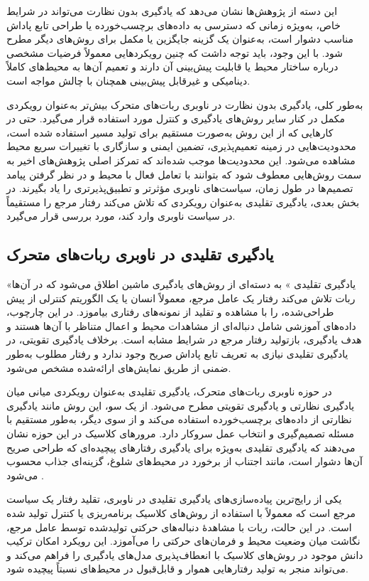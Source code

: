 این دسته از پژوهش‌ها نشان می‌دهد که یادگیری بدون نظارت می‌تواند در شرایط خاص، به‌ویژه زمانی که دسترسی به داده‌های برچسب‌خورده یا طراحی تابع پاداش مناسب دشوار است، به‌عنوان یک گزینه جایگزین یا مکمل برای روش‌های دیگر مطرح شود. با این وجود، باید توجه داشت که چنین رویکردهایی معمولاً فرضیات مشخصی درباره ساختار محیط یا قابلیت پیش‌بینی آن دارند و تعمیم آن‌ها به محیط‌های کاملاً دینامیکی و غیرقابل پیش‌بینی همچنان با چالش مواجه است.

به‌طور کلی، یادگیری بدون نظارت در ناوبری ربات‌های متحرک بیش‌تر به‌عنوان رویکردی مکمل در کنار سایر روش‌های یادگیری و کنترل مورد استفاده قرار می‌گیرد. حتی در کارهایی که از این روش به‌صورت مستقیم برای تولید مسیر استفاده شده است، محدودیت‌هایی در زمینه تعمیم‌پذیری، تضمین ایمنی و سازگاری با تغییرات سریع محیط مشاهده می‌شود. این محدودیت‌ها موجب شده‌اند که تمرکز اصلی پژوهش‌های اخیر به سمت روش‌هایی معطوف شود که بتوانند با تعامل فعال با محیط و در نظر گرفتن پیامد تصمیم‌ها در طول زمان، سیاست‌های ناوبری مؤثرتر و تطبیق‌پذیرتری را یاد بگیرند. در بخش بعدی، یادگیری تقلیدی به‌عنوان رویکردی که تلاش می‌کند رفتار مرجع را مستقیماً در سیاست ناوبری وارد کند، مورد بررسی قرار می‌گیرد.

\subsection{یادگیری تقلیدی در ناوبری ربات‌های متحرک}

«یادگیری تقلیدی%
»
به دسته‌ای از روش‌های یادگیری ماشین اطلاق می‌شود که در آن‌ها ربات تلاش می‌کند رفتار یک عامل مرجع، معمولاً انسان یا یک الگوریتم کنترلی از پیش طراحی‌شده، را با مشاهده و تقلید از نمونه‌های رفتاری بیاموزد. در این چارچوب، داده‌های آموزشی شامل دنباله‌ای از مشاهدات محیط و اعمال متناظر با آن‌ها هستند و هدف یادگیری، بازتولید رفتار مرجع در شرایط مشابه است. برخلاف یادگیری تقویتی، در یادگیری تقلیدی نیازی به تعریف تابع پاداش صریح وجود ندارد و رفتار مطلوب به‌طور ضمنی از طریق نمایش‌های ارائه‌شده مشخص می‌شود.

در حوزه ناوبری ربات‌های متحرک، یادگیری تقلیدی به‌عنوان رویکردی میانی میان یادگیری نظارتی و یادگیری تقویتی مطرح می‌شود. از یک سو، این روش مانند یادگیری نظارتی از داده‌های برچسب‌خورده استفاده می‌کند و از سوی دیگر، به‌طور مستقیم با مسئله تصمیم‌گیری و انتخاب عمل سروکار دارد. مرورهای کلاسیک در این حوزه نشان می‌دهند که یادگیری تقلیدی به‌ویژه برای یادگیری رفتارهای پیچیده‌ای که طراحی صریح آن‌ها دشوار است، مانند اجتناب از برخورد در محیط‌های شلوغ، گزینه‌ای جذاب محسوب می‌شود%
\cite{argall2009survey}.

یکی از رایج‌ترین پیاده‌سازی‌های یادگیری تقلیدی در ناوبری، تقلید رفتار یک سیاست مرجع است که معمولاً با استفاده از روش‌های کلاسیک برنامه‌ریزی یا کنترل تولید شده است. در این حالت، ربات با مشاهدهٔ دنباله‌های حرکتی تولیدشده توسط عامل مرجع، نگاشت میان وضعیت محیط و فرمان‌های حرکتی را می‌آموزد. این رویکرد امکان ترکیب دانش موجود در روش‌های کلاسیک با انعطاف‌پذیری مدل‌های یادگیری را فراهم می‌کند و می‌تواند منجر به تولید رفتارهایی هموار و قابل‌قبول در محیط‌های نسبتاً پیچیده شود.

